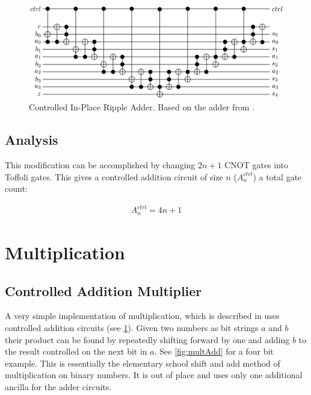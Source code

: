     \begin{figure}[ht]
      \capstart
      \centering
      \includegraphics[width=\textwidth]{images/4BitRippleAdderCtrl}
      \caption{Controlled In-Place Ripple Adder. Based on the adder from \cite{CDKM:2004}. }
      \label{fig:ctrlRipple}
    \end{figure}
    \subsection{Analysis}

      This modification can be accomplished by changing $2n+1$ CNOT gates into
      Toffoli gates.  This gives a controlled addition circuit of size $n$
      ($A^{ctrl}_n$) a total gate count:

      \begin{align} \label{eq:cadd}
        A^{ctrl}_n = 4n+1
      \end{align}

\section{Multiplication}
  \subsection{Controlled Addition Multiplier}

    A very simple implementation of multiplication, which is described in
   \cite{offermann2010} uses controlled addition circuits (see
   \cref{fig:ctrlRipple}). Given two numbers as bit strings $a$ and $b$ their
   product can be found by repeatedly shifting forward by one and adding $b$ to
   the result controlled on the next bit in $a$.  See \cref{fig:multAdd} for a
  four bit example. This is essentially the elementary school shift and add
  method of multiplication on binary numbers. It is out of place and uses only
  one additional ancilla for the adder circuits.

